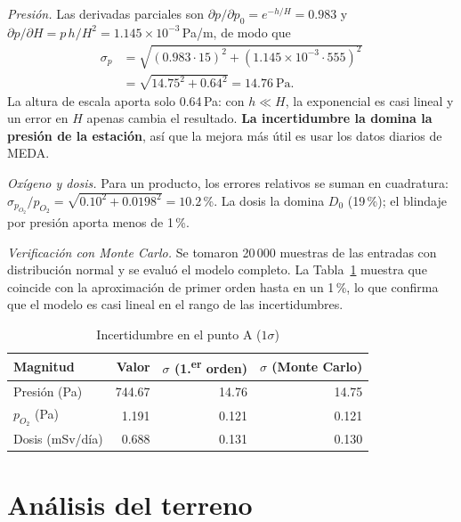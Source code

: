 \documentclass[conference]{IEEEtran}
\begin{document}
\emph{Presión.} Las derivadas parciales son $\partial p/\partial p_0 = e^{-h/H} = 0.983$ y $\partial p/\partial H = p\,h/H^2 = 1.145\times10^{-3}$\,Pa/m, de modo que
\begin{align}
\sigma_p &= \sqrt{(0.983\cdot15)^2 + (1.145\times10^{-3}\cdot555)^2}\nonumber\\
&= \sqrt{14.75^2 + 0.64^2} = 14.76\ \text{Pa}.
\end{align}
La altura de escala aporta solo 0.64\,Pa: con $h \ll H$, la exponencial es casi lineal y un error en $H$ apenas cambia el resultado. \textbf{La incertidumbre la domina la presión de la estación}, así que la mejora más útil es usar los datos diarios de MEDA.

\emph{Oxígeno y dosis.} Para un producto, los errores relativos se suman en cuadratura: $\sigma_{p_{O_2}}/p_{O_2} = \sqrt{0.10^2 + 0.0198^2} = 10.2$\,\%. La dosis la domina $D_0$ (19\,\%); el blindaje por presión aporta menos de 1\,\%.

\emph{Verificación con Monte Carlo.} Se tomaron 20\,000 muestras de las entradas con distribución normal y se evaluó el modelo completo. La Tabla~\ref{tab:incert} muestra que coincide con la aproximación de primer orden hasta en un 1\,\%, lo que confirma que el modelo es casi lineal en el rango de las incertidumbres.

\begin{table}[t]
\caption{Incertidumbre en el punto A ($1\sigma$)}
\label{tab:incert}
\centering\small
\begin{tabular}{@{}lrrr@{}}
\toprule
Magnitud & Valor & $\sigma$ (1.\textsuperscript{er} orden) & $\sigma$ (Monte Carlo) \\ \midrule
Presión (Pa) & 744.67 & 14.76 & 14.75 \\
$p_{O_2}$ (Pa) & 1.191 & 0.121 & 0.121 \\
Dosis (mSv/día) & 0.688 & 0.131 & 0.130 \\
\bottomrule
\end{tabular}
\end{table}

\section{Análisis del terreno}\label{sec:terreno}
\end{document}
